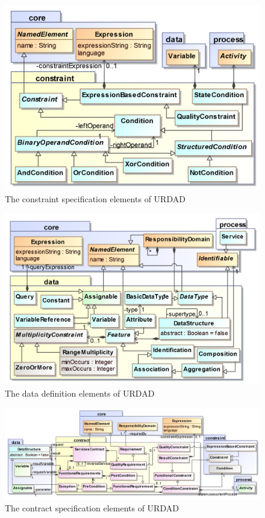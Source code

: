 \begin{figure}
  \centering
  \includegraphics{constraint}
  \caption{The constraint specification elements of URDAD}
  \label{fig:metamodel}
\end{figure}

\begin{figure}
  \centering
  \includegraphics{data}
  \caption{The data definition elements of URDAD}
  \label{fig:metamodel}
\end{figure}

\begin{figure}
  \centering
  \includegraphics{contract}
  \caption{The contract specification elements of URDAD}
  \label{fig:metamodel}
\end{figure}

